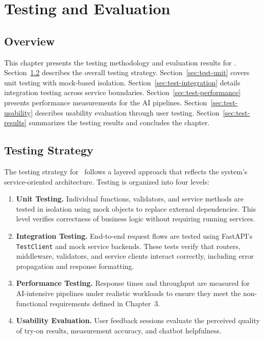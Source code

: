\chapter{Testing and Evaluation}

\section{Overview}
This chapter presents the testing methodology and evaluation results for \projectname. Section~\ref{sec:test-strategy} describes the overall testing strategy. Section~\ref{sec:test-unit} covers unit testing with mock-based isolation. Section~\ref{sec:test-integration} details integration testing across service boundaries. Section~\ref{sec:test-performance} presents performance measurements for the AI pipelines. Section~\ref{sec:test-usability} describes usability evaluation through user testing. Section~\ref{sec:test-results} summarizes the testing results and concludes the chapter.

\section{Testing Strategy}
\label{sec:test-strategy}

The testing strategy for \projectname\ follows a layered approach that reflects the system's service-oriented architecture. Testing is organized into four levels:

\begin{enumerate}[leftmargin=*]
    \item \textbf{Unit Testing.} Individual functions, validators, and service methods are tested in isolation using mock objects to replace external dependencies. This level verifies correctness of business logic without requiring running services.

    \item \textbf{Integration Testing.} End-to-end request flows are tested using FastAPI's \texttt{TestClient} and mock service backends. These tests verify that routers, middleware, validators, and service clients interact correctly, including error propagation and response formatting.

    \item \textbf{Performance Testing.} Response times and throughput are measured for AI-intensive pipelines under realistic workloads to ensure they meet the non-functional requirements defined in Chapter~3.

    \item \textbf{Usability Evaluation.} User feedback sessions evaluate the perceived quality of try-on results, measurement accuracy, and chatbot helpfulness.
\end{enumerate}

